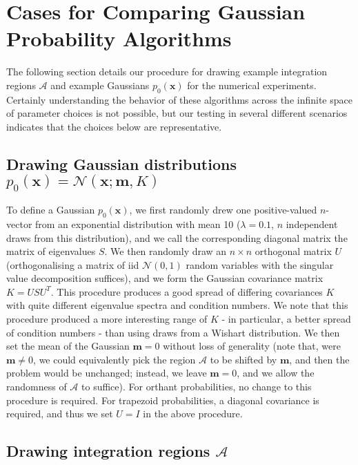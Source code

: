 \documentclass[twoside,11pt]{article}
\def\x{{\mathbf x}}
\def\m{{\mathbf m}}
\def\regionA{\mathcal{A}}
\begin{document}
\section{Cases for Comparing Gaussian Probability Algorithms}
\label{sec:testcases}

The following section details our procedure for drawing example integration regions $\regionA$ and example Gaussians $p_0(\x)$ for the numerical experiments.  Certainly understanding the behavior of these algorithms across the infinite space of parameter choices is not possible, but our testing in several different scenarios indicates that the choices below are representative.

\subsection{Drawing Gaussian distributions $p_0(\x) = \mathcal{N}(\x; \m,K)$}

To define a Gaussian $p_0(\x)$, we first randomly
drew one positive-valued $n$-vector from an exponential distribution with mean
10 ($\lambda = 0.1$, $n$ independent draws from this distribution),
and we call the corresponding diagonal matrix the matrix of eigenvalues $S$.  We then
randomly draw an $n\times n$ 
orthogonal matrix $U$ (orthogonalising a matrix of iid $\mathcal{N}(0,1)$ random variables with the singular
value decomposition suffices), and we form the Gaussian covariance matrix
$K = USU^T$.  This procedure produces a good spread of differing
covariances $K$ with quite different eigenvalue 
spectra and condition numbers. We
note that this procedure produced a more interesting range of
$K$ - in particular, a better spread of condition numbers - than using draws from a Wishart distribution.  We
then set the mean of the Gaussian $\m=0$ without loss of
generality (note that, were $\m\neq 0$, we could equivalently
pick the region $\regionA$ to be shifted by $\m$, and then the
problem would be unchanged; instead, we leave $\m=0$, and we
allow the randomness of $\regionA$ to suffice).   For orthant probabilities, no change to this procedure is required.  For trapezoid probabilities, a diagonal covariance is required, and thus we set $U = I$ in the above procedure.

\subsection{Drawing integration regions $\regionA$}
\end{document}
